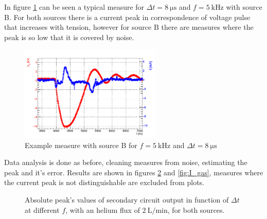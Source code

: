 In figure \ref{fig:tens_curr} can be seen a typical measure for $\Delta t = \SI{8}{\micro\second}$ and $f =\SI{5}{\kilo\hertz}$ with source B. For both sources there is a current peak in correspondence of voltage pulse that increases with tension, however for source B there are measures where the peak is so low that it is covered by noise.
\begin{figure}
\centering
 \includegraphics[width=0.6\textwidth]{Images/Electric/tenscurr_f5_t8.png}
 \caption{Example measure with source B for $f = \SI{5}{\kilo\hertz}$ and $\Delta t = \SI{8}{\micro\second}$}
 \label{fig:tens_curr}
\end{figure}


Data analysis is done as before, cleaning measures from noise, estimating the peak and it's error. Results are shown in figures \ref{fig:Vpp_gas} and \ref{fig:I_gas}, measures where the current peak is not distinguishable are excluded from plots.
\begin{figure}
 \centering
 
 \caption{Absolute peak's values of secondary circuit output in function of $\Delta t$ at different $f$, with an helium flux of $\SI{2}{\liter/\minute}$, for both sources.}
 \label{fig:Vpp_gas}
\end{figure}

